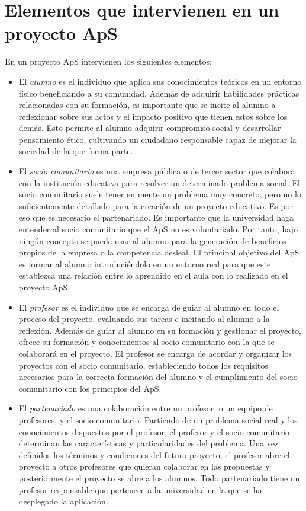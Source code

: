 \documentclass[11pt]{book}
\begin{document}
	\section{Elementos que intervienen en un proyecto ApS}
	En un proyecto ApS intervienen los siguientes elementos:
	\begin{itemize} 
		\item El \emph{alumno} es el individuo que aplica sus conocimientos teóricos en un entorno físico beneficiando a su comunidad. Además de adquirir habilidades prácticas relacionadas con su formación, es importante que se incite al alumno a reflexionar sobre sus actos y el impacto positivo que tienen estos sobre los demás. Esto permite al alumno adquirir compromiso social y desarrollar pensamiento ético, cultivando un ciudadano responsable capaz de mejorar la sociedad de la que forma parte.
		
		\item El \emph{socio comunitario} es una empresa pública o de tercer sector que colabora con la institución educativa para resolver un determinado problema social. El socio comunitario suele tener en mente un problema muy concreto, pero no lo suficientemente detallado para la creación de un proyecto educativo. Es por eso que es necesario el partenariado. Es importante que la universidad haga entender al socio comunitario que el ApS no es voluntariado. Por tanto, bajo ningún concepto se puede usar al alumno para la generación de beneficios propios de la empresa o la competencia desleal. El principal objetivo del ApS es formar al alumno introduciéndolo en un entorno real para que este establezca una relación entre lo aprendido en el aula con lo realizado en el proyecto ApS.
		
		\item El \emph{profesor} es el individuo que se encarga de guiar al alumno en todo el proceso del proyecto, evaluando sus tareas e incitando al alumno a la reflexión. Además de guiar al alumno en su formación y gestionar el proyecto, ofrece su formación y conocimientos al socio comunitario con la que se colaborará en el proyecto. El profesor se encarga de acordar y organizar los proyectos con el socio comunitario, estableciendo todos los requisitos necesarios para la correcta formación del alumno y el cumplimiento del socio comunitario con los principios del ApS.
		
		\item El \emph{partenariado} es una colaboración entre un profesor, o un equipo de profesores, y el socio comunitario. Partiendo de un problema social real y los conocimientos dispuestos por el profesor, el profesor y el socio comunitario determinan las características y particularidades del problema. Una vez definidos los términos y condiciones del futuro proyecto, el profesor abre el proyecto a otros profesores que quieran colaborar en las propuestas y posteriormente el proyecto se abre a los alumnos. Todo partenariado tiene un profesor responsable que pertenece a la universidad en la que se ha desplegado la aplicación.
		

\end{itemize}
\end{document}
